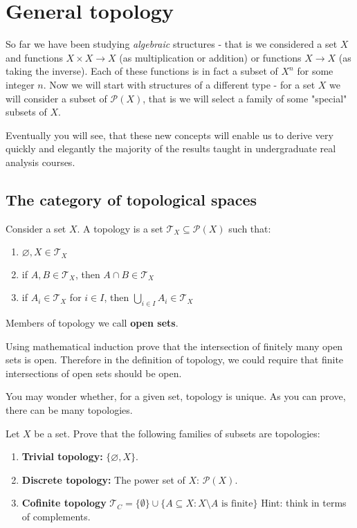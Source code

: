 \chapter{General topology}
\label{general_topology}
So far we have been studying \emph{algebraic} structures - that is we considered a set $X$ and functions $X\times X\to X$ (as multiplication or addition)
or functions $X\to X$ (as taking the inverse). Each of these functions is in fact a subset of $X^n$ for some integer $n$. Now we will start with structures of a different type - for a set
$X$ we will consider a subset of $\mathcal P(X)$, that is we will select a family of some "special" subsets of $X$.

Eventually you will see, that these new concepts will enable us
to derive very quickly and elegantly the majority of the results
taught in undergraduate real analysis courses.

\section{The category of topological spaces}
Consider a set $X$. A topology is a set $\mathcal{T}_X \subseteq \mathcal P(X) $ such that:
\begin{enumerate}
	\item $\varnothing, X\in \mathcal{T}_X$
	\item if $A, B\in \mathcal{T}_X$, then $A\cap B\in \mathcal{T}_X$
	\item if $A_i\in \mathcal{T}_X$ for $i\in I$, then $\bigcup_{i\in I} A_i\in \mathcal T_X$
\end{enumerate}
Members of topology we call \textbf{open sets}.

\begin{prob}
	Using mathematical induction prove that the intersection of finitely many open sets is open. Therefore in the definition of topology, we could require that finite intersections of open
  sets should be open.
\end{prob}

You may wonder whether, for a given set, topology is unique. As you can prove, there can be many topologies.

\begin{exercise}
  Let $X$ be a set. Prove that the following families of subsets are topologies:
  \begin{enumerate}
    \item \textbf{Trivial topology:} $\{\varnothing, X\}$.
    \item \textbf{Discrete topology:} The power set of $X$: $\mathcal P(X)$.
    \item \textbf{Cofinite topology} $\mathcal T_C=\{\emptyset\}\cup \{A\subseteq X : X\setminus A \text{ is finite}\}$ Hint: think in terms of complements.
  \end{enumerate}
\end{exercise}

